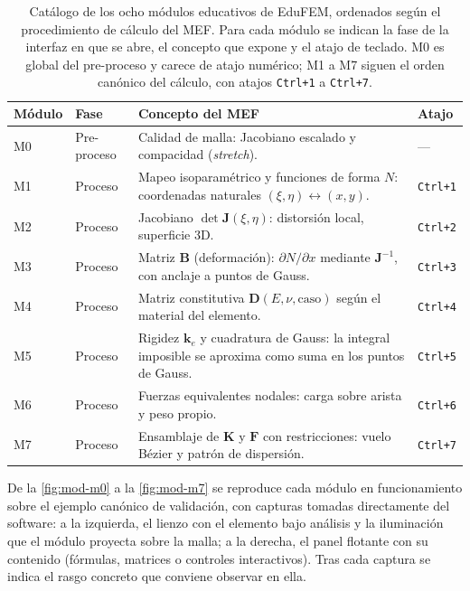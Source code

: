 \begin{table}[H]
\centering
\caption[Catálogo de los ocho módulos educativos de EduFEM.]{Catálogo de los ocho módulos educativos de EduFEM, ordenados según el procedimiento de cálculo del MEF. Para cada módulo se indican la fase de la interfaz en que se abre, el concepto que expone y el atajo de teclado. M0 es global del pre-proceso y carece de atajo numérico; M1 a M7 siguen el orden canónico del cálculo, con atajos \texttt{Ctrl+1} a \texttt{Ctrl+7}.}
\label{tab:modulos-edu}
\begin{tabular}{l l p{6.2cm} l}
\toprule
\textbf{Módulo} & \textbf{Fase} & \textbf{Concepto del MEF} & \textbf{Atajo} \\
\midrule
M0 & Pre-proceso  & Calidad de malla: Jacobiano escalado y compacidad (\emph{stretch}). & --- \\
M1 & Proceso      & Mapeo isoparamétrico y funciones de forma $N$: coordenadas naturales $(\xi,\eta) \leftrightarrow (x,y)$. & \texttt{Ctrl+1} \\
M2 & Proceso      & Jacobiano $\det\bm{J}(\xi,\eta)$: distorsión local, superficie 3D. & \texttt{Ctrl+2} \\
M3 & Proceso      & Matriz $\bm{B}$ (deformación): $\partial N/\partial x$ mediante $\bm{J}^{-1}$, con anclaje a puntos de Gauss. & \texttt{Ctrl+3} \\
M4 & Proceso      & Matriz constitutiva $\bm{D}(E,\nu,\text{caso})$ según el material del elemento. & \texttt{Ctrl+4} \\
M5 & Proceso      & Rigidez $\bm{k}_e$ y cuadratura de Gauss: la integral imposible se aproxima como suma en los puntos de Gauss. & \texttt{Ctrl+5} \\
M6 & Proceso      & Fuerzas equivalentes nodales: carga sobre arista y peso propio. & \texttt{Ctrl+6} \\
M7 & Proceso      & Ensamblaje de $\bm{K}$ y $\bm{F}$ con restricciones: vuelo Bézier y patrón de dispersión. & \texttt{Ctrl+7} \\
\bottomrule
\end{tabular}
\end{table}


De la \autoref{fig:mod-m0} a la \autoref{fig:mod-m7} se reproduce cada módulo en funcionamiento sobre el ejemplo canónico de validación, con capturas tomadas directamente del software: a la izquierda, el lienzo con el elemento bajo análisis y la iluminación que el módulo proyecta sobre la malla; a la derecha, el panel flotante con su contenido (fórmulas, matrices o controles interactivos). Tras cada captura se indica el rasgo concreto que conviene observar en ella.

